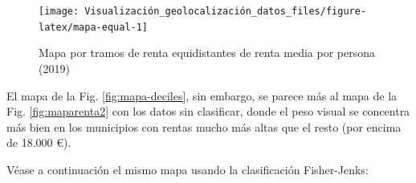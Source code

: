 \documentclass[
]{report}
\newenvironment{Shaded}{\begin{snugshade}}{\end{snugshade}}
\newcommand{\AttributeTok}[1]{\textcolor[rgb]{0.77,0.63,0.00}{#1}}
\newcommand{\CommentTok}[1]{\textcolor[rgb]{0.56,0.35,0.01}{\textit{#1}}}
\newcommand{\ConstantTok}[1]{\textcolor[rgb]{0.00,0.00,0.00}{#1}}
\newcommand{\FunctionTok}[1]{\textcolor[rgb]{0.00,0.00,0.00}{#1}}
\newcommand{\NormalTok}[1]{#1}
\newcommand{\OtherTok}[1]{\textcolor[rgb]{0.56,0.35,0.01}{#1}}
\newcommand{\SpecialCharTok}[1]{\textcolor[rgb]{0.00,0.00,0.00}{#1}}
\newcommand{\StringTok}[1]{\textcolor[rgb]{0.31,0.60,0.02}{#1}}
\theoremstyle{definition}
\theoremstyle{definition}
\theoremstyle{definition}
\theoremstyle{definition}
\theoremstyle{remark}
\begin{document}
\begin{figure}

{\centering \texttt{[image: Visualización\_geolocalización\_datos\_files/figure-latex/mapa-equal-1]} 

}

\caption{Mapa por tramos de renta equidistantes de renta media por persona (2019)}\label{fig:mapa-equal}
\end{figure}

El mapa de la Fig. \ref{fig:mapa-deciles}, sin embargo, se parece más al mapa
de la Fig. \ref{fig:maparenta2} con los datos sin clasificar, donde el peso
visual se concentra más bien en los municipios con rentas mucho más altas que el
resto (por encima de 18.000 €).

Véase a continuación el mismo mapa usando la clasificación Fisher-Jenks:

\begin{Shaded}
\end{Shaded}
\end{document}
